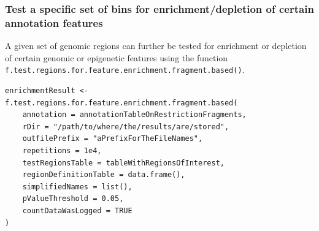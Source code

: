 \documentclass[a4paper,10pt]{article}
\begin{document}
\subsubsection{Test a specific set of bins for enrichment/depletion of certain annotation features}
A given set of genomic regions can further be tested for enrichment or depletion of certain genomic or epigenetic features using the function \texttt{f.test.regions.for.feature.enrichment.fragment.based()}.
\begin{verbatim}
enrichmentResult <- f.test.regions.for.feature.enrichment.fragment.based(
    annotation = annotationTableOnRestrictionFragments,
    rDir = "/path/to/where/the/results/are/stored",
    outfilePrefix = "aPrefixForTheFileNames",
    repetitions = 1e4,
    testRegionsTable = tableWithRegionsOfInterest,
    regionDefinitionTable = data.frame(),
    simplifiedNames = list(),
    pValueThreshold = 0.05,
    countDataWasLogged = TRUE
)
\end{verbatim}
\end{document}
